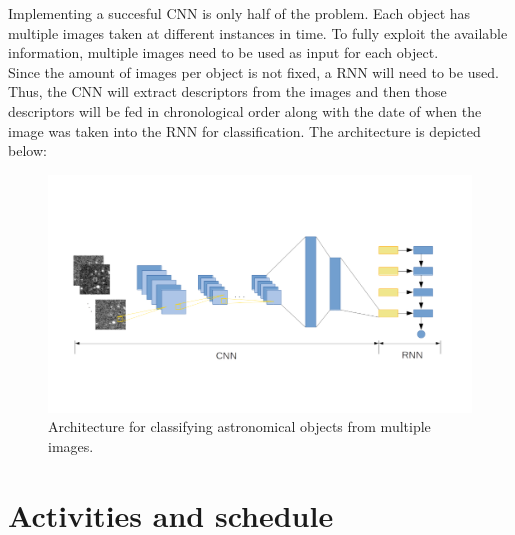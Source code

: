 Implementing a succesful CNN is only half of the problem. Each object has multiple images taken at different instances in time. To fully exploit the available information, multiple images need to be used as input for each object.\\

Since the amount of images per object is not fixed, a RNN will need to be used. Thus, the CNN will extract descriptors from the images and then those descriptors will be fed in chronological order along with the date of when the image was taken into the RNN for classification. The architecture is depicted below:

\begin{figure}[H]
  \centering
  \includegraphics[width=1.05\textwidth]{CNNRNNDiagram.png}
  \caption{Architecture for classifying astronomical objects from multiple images.}
\end{figure}

\section{Activities and schedule}

